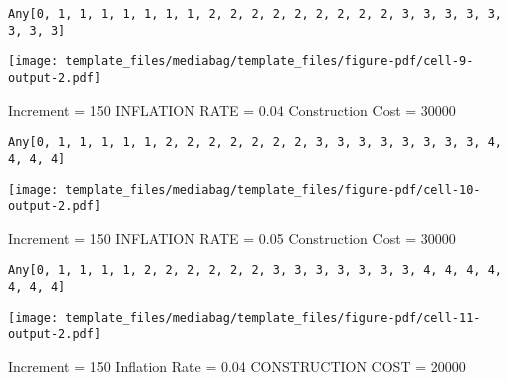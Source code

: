 \documentclass[
  11pt,
]{article}
\begin{document}
\begin{verbatim}
Any[0, 1, 1, 1, 1, 1, 1, 1, 2, 2, 2, 2, 2, 2, 2, 2, 2, 3, 3, 3, 3, 3, 3, 3, 3]
\end{verbatim}

\texttt{[image: template\_files/mediabag/template\_files/figure-pdf/cell-9-output-2.pdf]}

Increment = 150 INFLATION RATE = 0.04 Construction Cost = 30000

\begin{verbatim}
Any[0, 1, 1, 1, 1, 1, 2, 2, 2, 2, 2, 2, 2, 3, 3, 3, 3, 3, 3, 3, 3, 4, 4, 4, 4]
\end{verbatim}

\texttt{[image: template\_files/mediabag/template\_files/figure-pdf/cell-10-output-2.pdf]}

Increment = 150 INFLATION RATE = 0.05 Construction Cost = 30000

\begin{verbatim}
Any[0, 1, 1, 1, 1, 2, 2, 2, 2, 2, 2, 3, 3, 3, 3, 3, 3, 3, 4, 4, 4, 4, 4, 4, 4]
\end{verbatim}

\texttt{[image: template\_files/mediabag/template\_files/figure-pdf/cell-11-output-2.pdf]}

Increment = 150 Inflation Rate = 0.04 CONSTRUCTION COST = 20000
\end{document}
